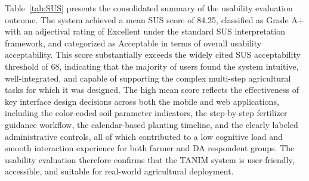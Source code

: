 {	Table~\ref{tab:SUS} presents the consolidated summary of the usability evaluation outcome. The system achieved a mean SUS score of 84.25, classified as Grade A+ with an adjectival rating of Excellent under the standard SUS interpretation framework, and categorized as Acceptable in terms of overall usability acceptability. This score substantially exceeds the widely cited SUS acceptability threshold of 68, indicating that the majority of users found the system intuitive, well-integrated, and capable of supporting the complex multi-step agricultural tasks for which it was designed. The high mean score reflects the effectiveness of key interface design decisions across both the mobile and web applications, including the color-coded soil parameter indicators, the step-by-step fertilizer guidance workflow, the calendar-based planting timeline, and the clearly labeled administrative controls, all of which contributed to a low cognitive load and smooth interaction experience for both farmer and DA respondent groups. The usability evaluation therefore confirms that the TANIM system is user-friendly, accessible, and suitable for real-world agricultural deployment.
	
	\pagebreak
} 